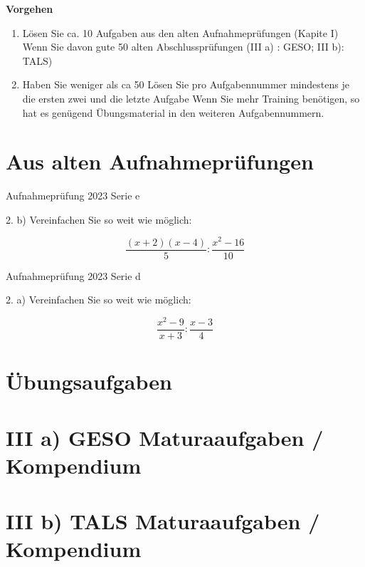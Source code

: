 


\newcommand{\LoesungsBlock}[1]{\noTRAINER{\TNTeop{}}\TRAINER{Lösung: #1}}

\usepackage{amssymb} %
\renewcommand{\metaHeaderLine}{Arbeitsblatt Bruchrechnen}
\renewcommand{\arbeitsblattTitel}{Zusammenfassung aller Übungen}

\newcommand{\TNTeopS}[1]{\TRAINER{#1}\noTRAINER{\TNTeop{}}}

\arbeitsblattHeader{}

\tableofcontents{}

\newpage


\textbf{Vorgehen}


\begin{enumerate}
\item 
Lösen Sie ca. 10 Aufgaben aus den alten Aufnahmeprüfungen (Kapite I)
Wenn Sie davon gute 50 %
alten Abschlussprüfungen (III a) : GESO; III b): TALS)

\item  Haben Sie weniger als ca 50%
Lösen Sie pro Aufgabennummer mindestens je die ersten zwei und die letzte Aufgabe
Wenn Sie mehr Training benötigen, so hat es genügend Übungsmaterial
in den weiteren Aufgabennummern.
\end{enumerate}

\newpage

\part{Aus alten Aufnahmeprüfungen}

Aufnahmeprüfung 2023 Serie e

2. b) Vereinfachen Sie so weit wie möglich:

$$\frac{(x+2)(x-4)}{5} : \frac{x^2 - 16}{10}$$
\LoesungsBlock{$\frac{2\cdot{}(x+2)}{x+4}$}

Aufnahmeprüfung 2023 Serie d

2. a) Vereinfachen Sie so weit wie möglich:

$$\frac{x^2-9}{x+3} : \frac{x-3}{4}$$


\part{Übungsaufgaben}

\part*{III a) GESO Maturaaufgaben / Kompendium}
\part*{III b) TALS Maturaaufgaben / Kompendium}



